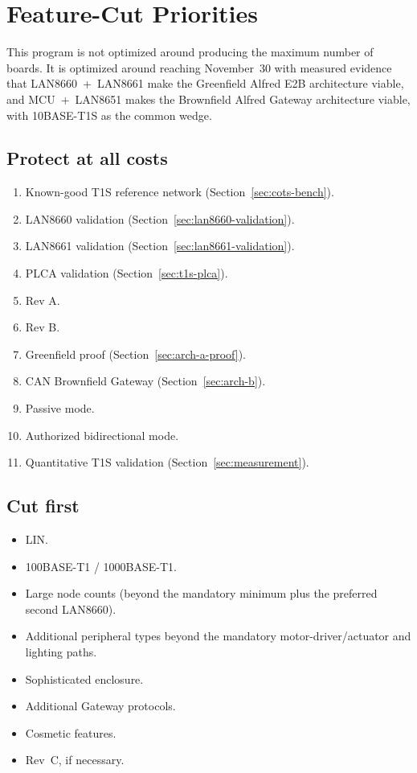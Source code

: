 \section{Feature-Cut Priorities}
\label{sec:feature-cuts}

This program is not optimized around producing the maximum number of boards. It is optimized around reaching November~30 with measured evidence that LAN8660~+~LAN8661 make the Greenfield Alfred E2B architecture viable, and MCU~+~LAN8651 makes the Brownfield Alfred Gateway architecture viable, with 10BASE-T1S as the common wedge.

\subsection{Protect at all costs}

\begin{enumerate}[itemsep=0.1em]
\item Known-good T1S reference network (Section~\ref{sec:cots-bench}).
\item LAN8660 validation (Section~\ref{sec:lan8660-validation}).
\item LAN8661 validation (Section~\ref{sec:lan8661-validation}).
\item PLCA validation (Section~\ref{sec:t1s-plca}).
\item Rev A.
\item Rev B.
\item Greenfield proof (Section~\ref{sec:arch-a-proof}).
\item CAN Brownfield Gateway (Section~\ref{sec:arch-b}).
\item Passive mode.
\item Authorized bidirectional mode.
\item Quantitative T1S validation (Section~\ref{sec:measurement}).
\end{enumerate}

\subsection{Cut first}

\begin{itemize}[itemsep=0.1em]
\item LIN.
\item 100BASE-T1 / 1000BASE-T1.
\item Large node counts (beyond the mandatory minimum plus the preferred second LAN8660).
\item Additional peripheral types beyond the mandatory motor-driver/actuator and lighting paths.
\item Sophisticated enclosure.
\item Additional Gateway protocols.
\item Cosmetic features.
\item Rev~C, if necessary.
\end{itemize}

